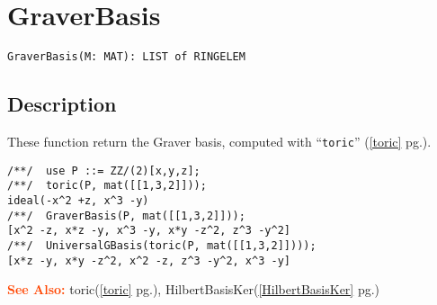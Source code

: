 \documentclass[a4paper]{mybook}
\newenvironment{command}{}{} %
\newcommand\SeeAlso{\par\textcolor{OrangeRed}{\textbf{\large See Also: }}}
\begin{document}
\section{GraverBasis}
\label{GraverBasis}
\begin{command} %


\begin{Verbatim}[label=syntax, rulecolor=\color{MidnightBlue},
frame=single]
GraverBasis(M: MAT): LIST of RINGELEM
\end{Verbatim}


\subsection*{Description}

These function return the Graver basis, computed with ``\verb&toric&'' (\ref{toric} pg.\pageref{toric}).
\begin{Verbatim}[label=example, rulecolor=\color{PineGreen}, frame=single]
/**/  use P ::= ZZ/(2)[x,y,z];
/**/  toric(P, mat([[1,3,2]]));
ideal(-x^2 +z, x^3 -y)
/**/  GraverBasis(P, mat([[1,3,2]]));
[x^2 -z, x*z -y, x^3 -y, x*y -z^2, z^3 -y^2]
/**/  UniversalGBasis(toric(P, mat([[1,3,2]])));
[x*z -y, x*y -z^2, x^2 -z, z^3 -y^2, x^3 -y]
\end{Verbatim}


\SeeAlso %
  toric(\ref{toric} pg.\pageref{toric}), 
    HilbertBasisKer(\ref{HilbertBasisKer} pg.\pageref{HilbertBasisKer})
\end{command} %
\end{document}

